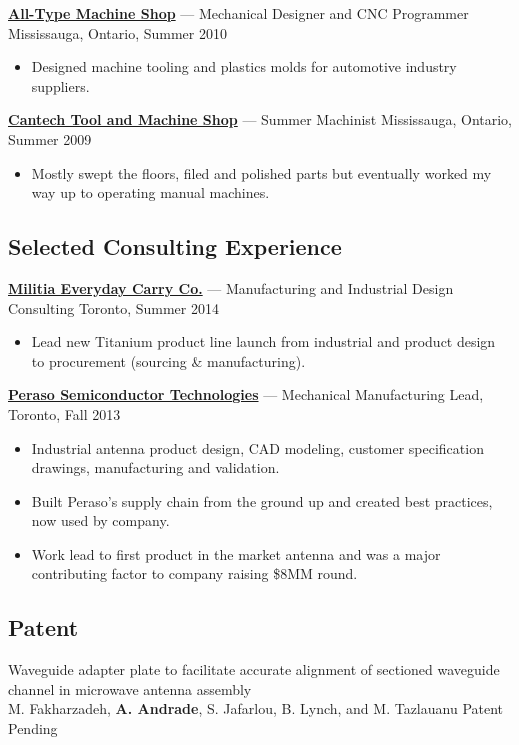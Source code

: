 \documentclass[pdftex,11pt,letterpaper]{article}
\begin{document}
\href{http://atmshop.ca/}{\textbf{All-Type Machine Shop}} --- Mechanical Designer and CNC Programmer \hfill {\color{gray} Mississauga, Ontario, Summer 2010}
\begin{itemize}
\item Designed machine tooling and plastics molds for automotive industry suppliers.
\end{itemize}

\href{http://www.manta.com/ic/mt6gc2l/ca/cantech-machine-tool-co-ltd}{\textbf{Cantech Tool and Machine Shop}} --- Summer Machinist \hfill {\color{gray} Mississauga, Ontario, Summer 2009}
\begin{itemize}
\item Mostly swept the floors, filed and polished parts but eventually worked my way up to operating manual machines. 
\end{itemize}
  
\subsection*{Selected Consulting Experience}

\href{http://www.haloculturecanada.com/collections/titanium-flash-edc}{\textbf{Militia Everyday Carry Co.}} --- Manufacturing and Industrial Design Consulting \hfill {\color{gray} Toronto, Summer 2014}
\begin{itemize}
  \item Lead new Titanium product line launch from industrial and product design to procurement (sourcing \& manufacturing).
\end{itemize}

\href{http://www.perasotech.com/}{\textbf{Peraso Semiconductor Technologies}} --- Mechanical Manufacturing Lead, \hfill {\color{gray} Toronto, Fall 2013}
\begin{itemize}
  \item Industrial antenna product design, CAD modeling, customer specification drawings, manufacturing and validation.
  \item Built Peraso's supply chain from the ground up and created best practices, now used by company.
  \item Work lead to first product in the market antenna and was a major contributing factor to company raising \$8MM round.
\end{itemize}

\subsection*{Patent}
Waveguide adapter plate to facilitate accurate alignment of sectioned waveguide channel in microwave antenna assembly \color{gray} \\ {M. Fakharzadeh, \textbf{A. Andrade}, S. Jafarlou, B. Lynch, and M. Tazlauanu} \hfill {\color{gray} Patent Pending}
\color{black}
\end{document}
